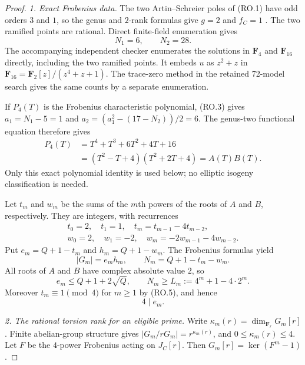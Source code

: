 \begin{proof}
\emph{1. Exact Frobenius data.}
The two Artin--Schreier poles of (RO.1) have odd orders
$3$ and $1$, so the genus and $2$-rank formulas give
$g=2$ and $f_C=1$ \cite[Lemma~2.6]{PriesZhu2012}.
The two ramified points are rational.
Direct finite-field enumeration gives
\[
                 N_1=6,\qquad N_2=28.
\tag{RO.3}
\]
The accompanying independent checker enumerates the
solutions in $\mathbf F_4$ and $\mathbf F_{16}$ directly,
including the two ramified points.  It embeds $u$ as
$z^2+z$ in $\mathbf F_{16}=\mathbf F_2[z]/(z^4+z+1)$.
The trace-zero method in the retained 72-model search
gives the same counts by a separate enumeration.

If $P_4(T)$ is the Frobenius characteristic polynomial,
(RO.3) gives $a_1=N_1-5=1$ and
$a_2=(a_1^2-(17-N_2))/2=6$.
The genus-two functional equation therefore gives
\[
 \begin{aligned}
 P_4(T)&=T^4+T^3+6T^2+4T+16\\
       &=(T^2-T+4)(T^2+2T+4)=A(T)B(T).
 \end{aligned}
\tag{RO.4}
\]
Only this exact polynomial identity is used below;
no elliptic isogeny classification is needed.

Let $t_m$ and $w_m$ be the sums of the $m$th powers of
the roots of $A$ and $B$, respectively.  They are integers,
with recurrences
\[
\begin{gathered}
 t_0=2,\quad t_1=1,\quad t_m=t_{m-1}-4t_{m-2},\\
 w_0=2,\quad w_1=-2,\quad w_m=-2w_{m-1}-4w_{m-2}.
\end{gathered}
\tag{RO.5}
\]
Put $e_m=Q+1-t_m$ and $h_m=Q+1-w_m$.
The Frobenius formulas \cite[Theorem~19.1(b)]{MilneAV} yield
\[
             |G_m|=e_mh_m,\qquad N_m=Q+1-t_m-w_m.
\tag{RO.6}
\]
All roots of $A$ and $B$ have complex absolute value $2$,
so
\[
 e_m\le Q+1+2\sqrt Q,
 \qquad N_m\ge L_m:=4^m+1-4\cdot2^m.
\tag{RO.7}
\]
Moreover $t_m\equiv1\pmod4$ for $m\ge1$ by (RO.5),
and hence
\[
                               4\mid e_m.
\tag{RO.8}
\]

\emph{2. The rational torsion rank for an eligible prime.}
Write $\kappa_m(r)=\dim_{\mathbf F_r}G_m[r]$.
Finite abelian-group structure gives
$|G_m/rG_m|=r^{\kappa_m(r)}$, and
$0\le\kappa_m(r)\le4$.
Let $F$ be the $4$-power Frobenius acting on $J_C[r]$.
Then $G_m[r]=\ker(F^m-1)$.


\end{proof}
